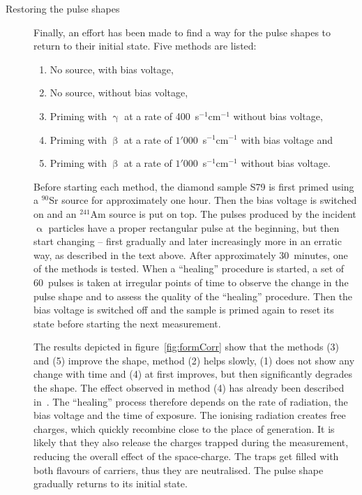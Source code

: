 \begin{description}
\item[Restoring the pulse shapes] Finally, an effort has been made to find a way for the pulse shapes to return to their initial state. Five methods are listed: 
\begin{enumerate}[itemsep=0.1\baselineskip]
\item No source, with bias voltage, 
\item No source, without bias voltage, 
\item Priming with $\upgamma$ at a rate of 400~s$^{-1}$cm$^{-1}$ without bias voltage, 
\item Priming with $\upbeta$ at a rate of $1'000$~s$^{-1}$cm$^{-1}$ with bias voltage and 
\item Priming with $\upbeta$ at a rate of $1'000$~s$^{-1}$cm$^{-1}$ without bias voltage. 
\end{enumerate}
Before starting each method, the diamond sample S79 is first primed using a $^{90}$Sr source for approximately one hour. Then the bias voltage is switched on and an $^{241}$Am source is put on top. The pulses produced by the incident $\upalpha$ particles have a proper rectangular pulse at the beginning, but then start changing -- first gradually and later increasingly more in an erratic way, as described in the text above. After approximately 30~minutes, one of the methods is tested. When a ``healing'' procedure is started, a set of 60~pulses is taken at irregular points of time to observe the change in the pulse shape and to assess the quality of the ``healing'' procedure. Then the bias voltage is switched off and the sample is primed again to reset its state before starting the next measurement. 

The results depicted in figure~\ref{fig:formCorr} show that the methods (3) and (5) improve the shape, method (2) helps slowly, (1) does not show any change with time and (4) at first improves, but then significantly degrades the shape. The effect observed in method (4) has already been described in~\cite{Kramberger:2013wva}. The ``healing'' process therefore depends on the rate of radiation, the bias voltage and the time of exposure. The ionising radiation creates free charges, which quickly recombine close to the place of generation. It is likely that they also release the charges trapped during the measurement, reducing the overall effect of the space-charge. The traps get filled with both flavours of carriers, thus they are neutralised. The pulse shape gradually returns to its initial state.


\end{description}
